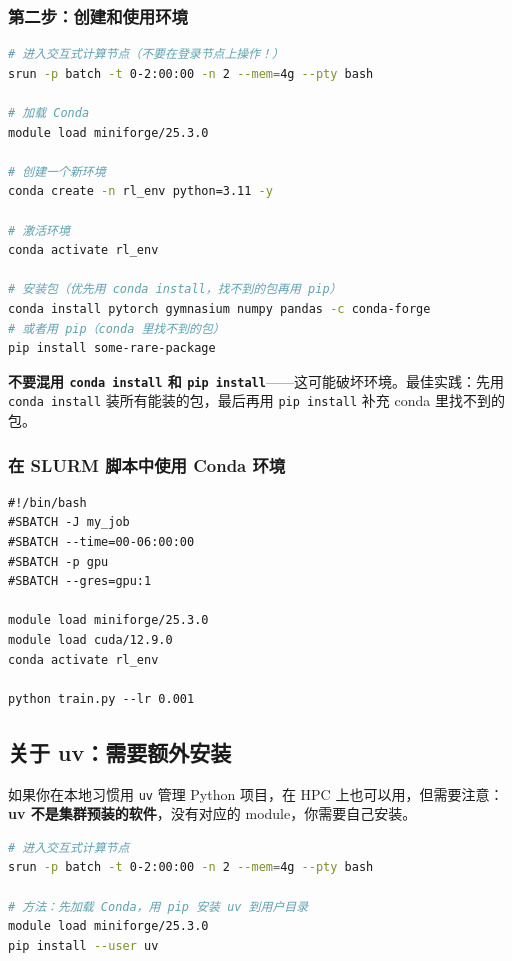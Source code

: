 \subsubsection{第二步：创建和使用环境}

\begin{lstlisting}[language=bash]
# 进入交互式计算节点（不要在登录节点上操作！）
srun -p batch -t 0-2:00:00 -n 2 --mem=4g --pty bash

# 加载 Conda
module load miniforge/25.3.0

# 创建一个新环境
conda create -n rl_env python=3.11 -y

# 激活环境
conda activate rl_env

# 安装包（优先用 conda install，找不到的包再用 pip）
conda install pytorch gymnasium numpy pandas -c conda-forge
# 或者用 pip（conda 里找不到的包）
pip install some-rare-package
\end{lstlisting}

\begin{warnbox}
\textbf{不要混用 \texttt{conda install} 和 \texttt{pip install}}——这可能破坏环境。最佳实践：先用 \texttt{conda install} 装所有能装的包，最后再用 \texttt{pip install} 补充 conda 里找不到的包。
\end{warnbox}

\subsubsection{在 SLURM 脚本中使用 Conda 环境}

\begin{lstlisting}[language=slurm]
#!/bin/bash
#SBATCH -J my_job
#SBATCH --time=00-06:00:00
#SBATCH -p gpu
#SBATCH --gres=gpu:1

module load miniforge/25.3.0
module load cuda/12.9.0
conda activate rl_env

python train.py --lr 0.001
\end{lstlisting}

\subsection{关于 uv：需要额外安装}

如果你在本地习惯用 \texttt{uv} 管理 Python 项目，在 HPC 上也可以用，但需要注意：\textbf{uv 不是集群预装的软件}，没有对应的 module，你需要自己安装。

\begin{lstlisting}[language=bash]
# 进入交互式计算节点
srun -p batch -t 0-2:00:00 -n 2 --mem=4g --pty bash

# 方法：先加载 Conda，用 pip 安装 uv 到用户目录
module load miniforge/25.3.0
pip install --user uv
\end{lstlisting}

